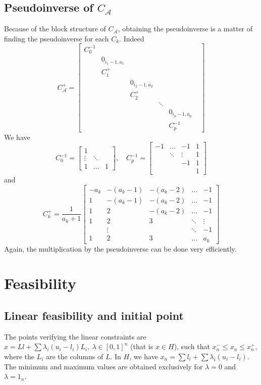 \documentclass[]{article}
\newcommand{\BIN}{\begin{bmatrix}}
\newcommand{\BOUT}{\end{bmatrix}}
\begin{document}
\subsection{Pseudoinverse of $C_{\mathcal{A}}$}
Because of the block structure of $C_{\mathcal{A}}$, obtaining the pseudoinverse is a matter of finding the pseudoinverse for each $C_k$. Indeed
\begin{equation}
  C_{\mathcal{A}}^+ = \BIN
    C_0^{-1} & & & & \\
    & 0_{i_1-1,a_1} & & & \\
    & C_1^+& & &\\
    && 0_{i_2-1,a_2} & & & \\
    && C_2^+&  & &\\
    &&& \ddots & \\
    &&&&0_{i_p-1,a_p} \\
    &&&& C_p^{-1}
  \BOUT
\end{equation}
We have
\begin{equation}
  C_0^{-1} = \BIN 
    1 &   & \\
    \vdots & \ddots & \\
    1 & \ldots & 1 \BOUT, \quad 
  C_p^{-1} = \BIN 
    -1 & \ldots & -1 & 1 \\
       & \ddots & \vdots & 1\\
       &        &  -1   & 1 \\
       &&& 1 \BOUT
\end{equation}
and
\begin{equation}
 C_k^+ = \frac{1}{a_k+1} \BIN
   -a_k & -(a_k-1) & -(a_k-2) & \ldots & -1 \\
     1  & -(a_k-1) & -(a_k-2) & \ldots & -1 \\
     1  &    2     & -(a_k-2) & \ldots & -1 \\
     1  &    2     &    3     & \ddots & \vdots \\
        & \vdots   &          & \ddots & -1 \\
     1  &    2     &    3     & \ldots & a_k
 \BOUT
\end{equation}
Again, the multiplication by the pseudoinverse can be done very efficiently.


\section{Feasibility}
\subsection{Linear feasibility and initial point}
The points verifying the linear constraints are $x = Ll + \sum \lambda_i (u_i-l_i) L_i, \ \lambda \in \left[0,1\right]^n$ (that is $x \in H$), such that $x_n^- \leq x_n \leq x_n^+$, where the $L_i$ are the columns of $L$.\newline
In $H$, we have $x_n = \sum l_i + \sum \lambda_i (u_i-l_i)$. The minimum and maximum values are obtained exclusively for $\lambda = 0$ and $\lambda = 1_n$.
\end{document}
